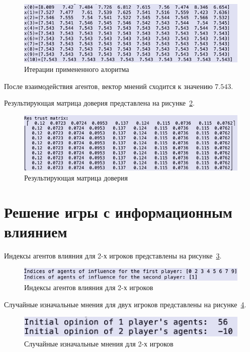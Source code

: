 \begin{figure}
  \centering
  \includegraphics[scale=0.6]{../../artifacts/lw6/3.png}
  \caption{Итерации примененного алоритма}
  \label{fig:fig03}
\end{figure}

После взаимодействия агентов, вектор мнений сходится к значению $7.543$.

Результирующая матрица доверия представлена на рисунке~\ref{fig:fig04}.

\begin{figure}
  \centering
  \includegraphics[scale=0.6]{../../artifacts/lw6/4.png}
  \caption{Результирующая матрица доверия}
  \label{fig:fig04}
\end{figure}

\section{Решение игры с информационным влиянием}

Индексы агентов влияния для 2-х игроков представлены на рисунке~\ref{fig:fig05}.

\begin{figure}
  \centering
  \includegraphics[scale=0.6]{../../artifacts/lw6/5.png}
  \caption{Индексы агентов влияния для 2-х игроков}
  \label{fig:fig05}
\end{figure}

Случайные изначальные мнения для двух игроков представлены на рисунке~\ref{fig:fig06}.

\begin{figure}
  \centering
  \includegraphics[scale=0.6]{../../artifacts/lw6/6.png}
  \caption{Случайные изначальные мнения для 2-х игроков}
  \label{fig:fig06}
\end{figure}

